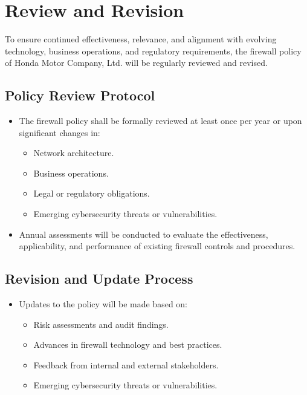 \section{Review and Revision}

To ensure continued effectiveness, relevance, and alignment with evolving technology, business operations, and regulatory requirements, the firewall policy of Honda Motor Company, Ltd. will be regularly reviewed and revised.

\subsection{Policy Review Protocol}
\begin{itemize}
    \item The firewall policy shall be formally reviewed at least once per year or upon significant changes in:
    
    \begin{itemize}
    \item Network architecture.
    
    \item Business operations.
    
    \item Legal or regulatory obligations.

    \item Emerging cybersecurity threats or vulnerabilities.
    \end{itemize}


 \item Annual assessments will be conducted to evaluate the effectiveness, applicability, and performance of existing firewall controls and procedures.

\end{itemize}

\subsection{Revision and Update Process}

\begin{itemize}
    \item Updates to the policy will be made based on:
    
    \begin{itemize}
    \item Risk assessments and audit findings.
    
    \item Advances in firewall technology and best practices.
    
    \item Feedback from internal and external stakeholders.

    \item Emerging cybersecurity threats or vulnerabilities.
\end{itemize}
\end{itemize}

